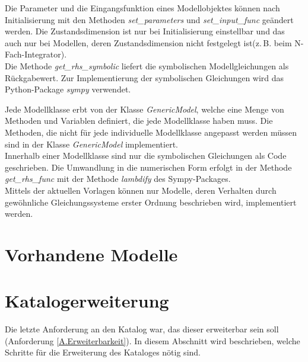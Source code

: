 Die Parameter und die Eingangsfunktion eines Modellobjektes können nach Initialisierung mit den Methoden \textit{set\_parameters} und \textit{set\_input\_func} geändert werden. Die Zustandsdimension ist nur bei Initialisierung einstellbar und das auch nur bei Modellen, deren Zustandsdimension nicht festgelegt ist(z.\,B. beim N-Fach-Integrator).\\
Die Methode \textit{get\_rhs\_symbolic} liefert die symbolischen Modellgleichungen als Rückgabewert. Zur Implementierung der symbolischen Gleichungen wird das Python-Package \textit{sympy} verwendet.

Jede Modellklasse erbt von der Klasse \textit{GenericModel}, welche eine Menge von Methoden und Variablen definiert, die jede Modellklasse haben muss. Die Methoden, die nicht für jede individuelle Modellklasse angepasst werden müssen sind in der Klasse \textit{GenericModel} implementiert.\\
Innerhalb einer Modellklasse sind nur die symbolischen Gleichungen als Code geschrieben. Die Umwandlung in die numerischen Form erfolgt in der Methode \textit{get\_rhs\_func} mit der Methode \textit{lambdify} des Sympy-Packages.\\

Mittels der aktuellen Vorlagen können nur Modelle, deren Verhalten durch gewöhnliche Gleichungssysteme erster Ordnung beschrieben wird, implementiert werden.

\section{Vorhandene Modelle}
\label{Ch:Ergebnisse:Sec:Modelle}

\section{Katalogerweiterung}
\label{Ch:Ergebnisse:Sec:Erweiterung}
Die letzte Anforderung an den Katalog war, das dieser erweiterbar sein soll (Anforderung \ref{A.Erweiterbarkeit}). In diesem Abschnitt wird beschrieben, welche Schritte für die Erweiterung des Kataloges nötig sind. 

